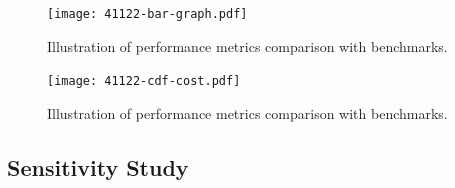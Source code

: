 \begin{figure}[ht]                                                      %
    \centering                                                          %
    \texttt{[image: 41122-bar-graph.pdf]}         %
    \caption{Illustration of performance metrics comparison with benchmarks.}
    \label{fig:bar_plot}                                                %
\end{figure}                                                            %
\begin{figure}[ht]                                                      %
    \centering                                                          %
    \texttt{[image: 41122-cdf-cost.pdf]}          %
    \caption{Illustration of performance metrics comparison with benchmarks.}
    \label{fig:cdf_cost}                                                %
\end{figure}                                                            %
\subsection{Sensitivity Study}
\label{subsec:advance}  

